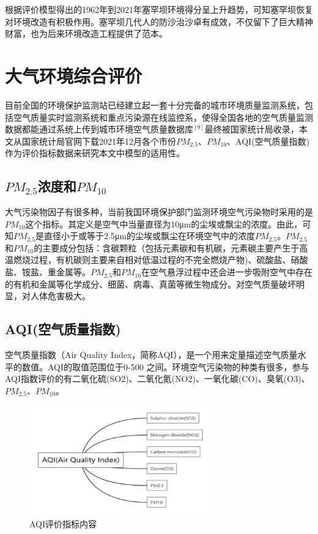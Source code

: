 \documentclass[UTF8]{ctexart}
\begin{document}
根据评价模型得出的1962年到2021年塞罕坝环境得分呈上升趋势，可知塞罕坝恢复对环境改造有积极作用。塞罕坝几代人的防沙治沙卓有成效，不仅留下了巨大精神财富，也为后来环境改造工程提供了范本。

\newpage
\section{大气环境综合评价}
目前全国的环境保护监测站已经建立起一套十分完备的城市环境质量监测系统，包括空气质量实时监测系统和重点污染源在线监控系，使得全国各地的空气质量监测数据都能通过系统上传到城市环境空气质量数据库$^{[9]}$最终被国家统计局收录，本文从国家统计局官网下载2021年12月各个市份$PM_{2.5}$、$PM_{10}$、AQI(空气质量指数)作为评价指标数据来研究本文中模型的适用性。

\subsection{$PM_{2.5}$浓度和$PM_{10}$}
大气污染物因子有很多种，当前我国环境保护部门监测环境空气污染物时采用的是$PM_{10}$这个指标。其定义是空气中当量直径为10μm的尘埃或飘尘的浓度。由此，可知$PM_{2.5}$是直径小于或等于2.5μm的尘埃或飘尘在环境空气中的浓度$PM_{2.5}$。$PM_{2.5}$和$PM_{10}$的主要成分包括：含碳颗粒（包括元素碳和有机碳，元素碳主要产生于高温燃烧过程，有机碳则主要来自相对低温过程的不完全燃烧产物)、硫酸盐、硝酸盐、铵盐、重金属等。$PM_{2.5}$和$PM_{10}$在空气悬浮过程中还会进一步吸附空气中存在的有机和金属等化学成分、细菌、病毒、真菌等微生物成分。对空气质量破坏明显，对人体危害极大。

\subsection{AQI(空气质量指数)}
空气质量指数（Air Quality Index，简称AQI），是一个用来定量描述空气质量水平的数值。AQI的取值范围位于0-500 之间。环境空气污染物的种类有很多，参与AQI指数评价的有二氧化硫(SO2)、二氧化氮(NO2)、一氧化碳(CO)、臭氧(O3)、$PM_{2.5}$、$PM_{10}$。

\begin{figure}[H] %
    \centering %
    \includegraphics[width=0.7\textwidth]{./picture/AQI.png} %
    \caption{AQI评价指标内容} 
\end{figure}
\end{document}
